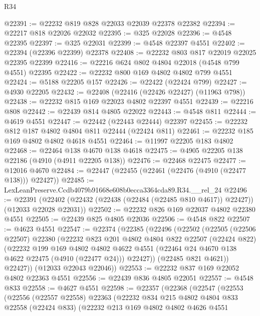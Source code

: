 \begin{lexlean}{R34}
\begin{coremodule}
@22391 := @22232 @819 @828 @22033 @22039 @22378 @22382
@22394 := @22217 @818 @22026 @22032
@22395 := @325 @22028
@22396 := @4548 @22395
@22397 := @325 @22031
@22399 := @4548 @22397 @4551
@22402 := @22394 (@22396 @22399) @22378
@22408 := @22232 @803 @817 @22019 @22025 @22395 @22399
@22416 := @22216 @624 @802 @4804 @22018 (@4548 @799 @4551) @22395
@22422 := @22232 @800 @169 @4802 @4802 @799 @4551
@22424 := @5188 @22205 @157
@22426 := @22422 (@22424 @799)
@22427 := @4930 @22205
@22432 := @22408 (@22416 (@22426 @22427) (@11963 @798))
@22438 := @22232 @815 @169 @22023 @4802 @22397 @4551
@22439 := @22216 @808
@22442 := @22439 @814 @4805 @22022
@22443 := @4548 @811
@22444 := @4619 @4551
@22447 := @22442 (@22443 @22444) @22397
@22455 := @22232 @812 @187 @4802 @4804 @811 @22444 (@22424 @811)
@22461 := @22232 @185 @169 @4802 @4802 @4618 @4551
@22464 := @11997 @22205 @183 @4802
@22468 := @22464 @138 @4670 @138 @4618
@22475 := @4905 @22205 @138 @22186 (@4910 (@4911 @22205 @138))
@22476 := @22468 @22475
@22477 := @12016 @4670
@22484 := @22447 (@22455 (@22461 (@22476 (@4910 (@22477 @138))) @22427))
@22485 := LexLeanPreserve.Ccdb4079b91668e608b0ecca3364cda89.R34.__rel_24
@22496 := @22391
    (@22402 (@22432 (@22438 (@22484 (@22485 @810 @4617)) @22427)) (@12033 @22028 @22031))
@22502 := @22232 @826 @169 @22037 @4802 @22380 @4551
@22505 := @22439 @825 @4805 @22036
@22506 := @4548 @822
@22507 := @4623 @4551
@22547 := @22374
    (@22385
      (@22496
        (@22502
          (@22505
            (@22506 @22507)
            @22380
            (@22232
              @823
              @201
              @4802
              @4804
              @822
              @22507
              (@22424 @822)
              (@22232
                @199
                @169
                @4802
                @4802
                @4622
                @4551
                (@22464 @24 @4670 @138 @4622 @22475 (@4910 (@22477 @24)))
                @22427))
            (@22485 @821 @4621))
          @22427))
      (@12033 @22043 @22046))
@22553 := @22232 @837 @169 @22052 @4802 @22363 @4551
@22556 := @22439 @836 @4805 @22051
@22557 := @4548 @833
@22558 := @4627 @4551
@22598 := @22357
    (@22368
      (@22547
        (@22553
          (@22556
            (@22557 @22558)
            @22363
            (@22232
              @834
              @215
              @4802
              @4804
              @833
              @22558
              (@22424 @833)
              (@22232
                @213
                @169
                @4802
                @4802
                @4626
                @4551

\end{coremodule}
\end{lexlean}
